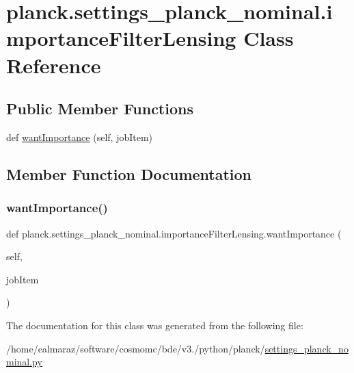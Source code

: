 \hypertarget{classplanck_1_1settings__planck__nominal_1_1importanceFilterLensing}{}\section{planck.\+settings\+\_\+planck\+\_\+nominal.\+importance\+Filter\+Lensing Class Reference}
\label{classplanck_1_1settings__planck__nominal_1_1importanceFilterLensing}
\subsection*{Public Member Functions}
\begin{DoxyCompactItemize}
\item 
def \mbox{\hyperlink{classplanck_1_1settings__planck__nominal_1_1importanceFilterLensing_ae58daa05d46b18010976f5ca8cc060fc}{want\+Importance}} (self, job\+Item)
\end{DoxyCompactItemize}


\subsection{Member Function Documentation}
\mbox{\label{classplanck_1_1settings__planck__nominal_1_1importanceFilterLensing_ae58daa05d46b18010976f5ca8cc060fc}} 
\subsubsection{\texorpdfstring{want\+Importance()}{wantImportance()}}
{\footnotesize\ttfamily def planck.\+settings\+\_\+planck\+\_\+nominal.\+importance\+Filter\+Lensing.\+want\+Importance (\begin{DoxyParamCaption}\item[{}]{self,  }\item[{}]{job\+Item }\end{DoxyParamCaption})}



The documentation for this class was generated from the following file\+:\begin{DoxyCompactItemize}
\item 
/home/ealmaraz/software/cosmomc/bde/v3./python/planck/\mbox{\hyperlink{settings__planck__nominal_8py}{settings\+\_\+planck\+\_\+nominal.\+py}}\end{DoxyCompactItemize}
